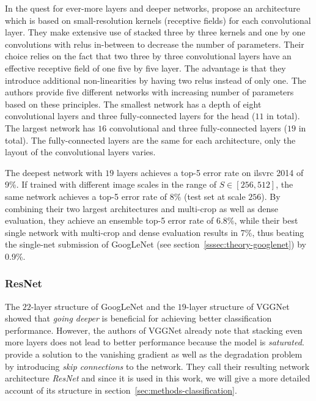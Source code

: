 \documentclass[draft,final]{vutinfth} %
\begin{document}
In the quest for ever-more layers and deeper networks,
\textcite{simonyan2015} propose an architecture which is based on
small-resolution kernels (receptive fields) for each convolutional
layer. They make extensive use of stacked three by three kernels and
one by one convolutions with \glspl{relu} in-between to decrease the
number of parameters. Their choice relies on the fact that two three
by three convolutional layers have an effective receptive field of one
five by five layer. The advantage is that they introduce additional
non-linearities by having two \glspl{relu} instead of only one. The
authors provide five different networks with increasing number of
parameters based on these principles. The smallest network has a depth
of eight convolutional layers and three fully-connected layers for the
head ($11$ in total). The largest network has $16$ convolutional and
three fully-connected layers ($19$ in total). The fully-connected
layers are the same for each architecture, only the layout of the
convolutional layers varies.

The deepest network with $19$ layers achieves a top-5 error rate on
\gls{ilsvrc} 2014 of 9\%. If trained with different image scales in
the range of $S \in [256, 512]$, the same network achieves a top-5 error
rate of 8\% (test set at scale $256$). By combining their two largest
architectures and multi-crop as well as dense evaluation, they achieve
an ensemble top-5 error rate of 6.8\%, while their best single network
with multi-crop and dense evaluation results in 7\%, thus beating the
single-net submission of GoogLeNet (see
section~\ref{sssec:theory-googlenet}) by 0.9\%.

\subsubsection{ResNet}
\label{sssec:theory-resnet}

The $22$-layer structure of GoogLeNet \cite{szegedy2015} and the
$19$-layer structure of VGGNet \cite{simonyan2015} showed that
\emph{going deeper} is beneficial for achieving better classification
performance. However, the authors of VGGNet already note that stacking
even more layers does not lead to better performance because the model
is \emph{saturated}. \textcite{he2016} provide a solution to the
vanishing gradient as well as the degradation problem by introducing
\emph{skip connections} to the network. They call their resulting
network architecture \emph{ResNet} and since it is used in this work,
we will give a more detailed account of its structure in
section~\ref{sec:methods-classification}.
\end{document}
